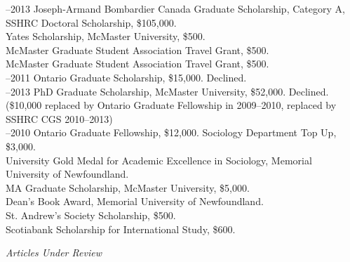 \documentclass[11pt,usenames,dvipsnames]{article}
\begin{document}



–2013 Joseph-Armand Bombardier Canada Graduate Scholarship, Category A, SSHRC Doctoral Scholarship, \$105,000.\\

 Yates Scholarship, McMaster University, \$500.\\

 McMaster Graduate Student Association Travel Grant, \$500.\\

 McMaster Graduate Student Association Travel Grant, \$500.\\

–2011 Ontario Graduate Scholarship, \$15,000. Declined.\\

–2013 PhD Graduate Scholarship, McMaster University, \$52,000. Declined. (\$10,000 replaced by Ontario Graduate Fellowship in 2009–2010, replaced by SSHRC CGS 2010–2013)\\

–2010 Ontario Graduate Fellowship, \$12,000. Sociology Department Top Up, \$3,000.\\

 University Gold Medal for Academic Excellence in Sociology, Memorial University of Newfoundland.\\

 MA Graduate Scholarship, McMaster University, \$5,000.\\

 Dean's Book Award, Memorial University of Newfoundland.\\

 St. Andrew’s Society Scholarship, \$500.\\

 Scotiabank Scholarship for International Study, \$600.\\



\noindent\emph{Articles Under Review \vspace{0.01in}}
\end{document}
